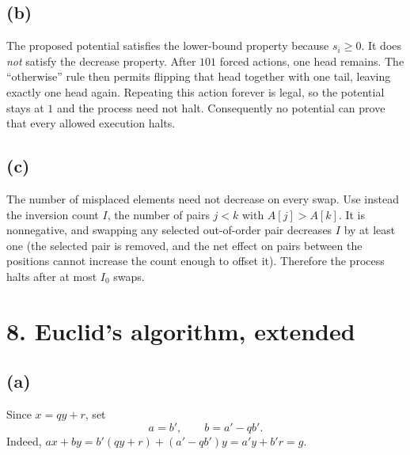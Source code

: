 \documentclass[11pt]{article}
\begin{document}
\subsection*{(b)} The proposed potential satisfies the lower-bound property because $s_i\ge0$.  It does \emph{not} satisfy the decrease property.  After $101$ forced actions, one head remains.  The ``otherwise'' rule then permits flipping that head together with one tail, leaving exactly one head again.  Repeating this action forever is legal, so the potential stays at $1$ and the process need not halt.  Consequently no potential can prove that every allowed execution halts.
\subsection*{(c)} The number of misplaced elements need not decrease on every swap.  Use instead the inversion count $I$, the number of pairs $j<k$ with $A[j]>A[k]$.  It is nonnegative, and swapping any selected out-of-order pair decreases $I$ by at least one (the selected pair is removed, and the net effect on pairs between the positions cannot increase the count enough to offset it).  Therefore the process halts after at most $I_0$ swaps.

\section*{8. Euclid's algorithm, extended}
\subsection*{(a)} Since $x=qy+r$, set
\[
\boxed{a=b',\qquad b=a'-qb'.}
\]
Indeed, $ax+by=b'(qy+r)+(a'-qb')y=a'y+b'r=g$.
\end{document}
